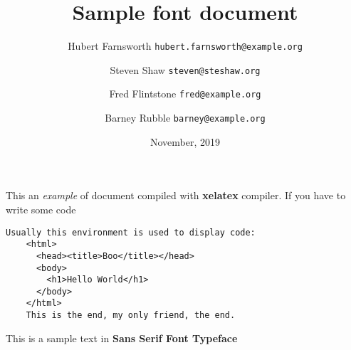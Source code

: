 \documentclass[14pt]{article}
\title{Sample font document}
\author{
  Hubert Farnsworth \texttt{hubert.farnsworth@example.org}
  \and
  Steven Shaw \texttt{steven@steshaw.org}
  \and
  Fred Flintstone \texttt{fred@example.org}
  \and
  Barney Rubble \texttt{barney@example.org}
}
\date{November, 2019}
\begin{document}
  \maketitle

  This an \textit{example} of document compiled with \textbf{xelatex} compiler.
  If you have to write some code

  \begin{Verbatim}[gobble = 4]
    Usually this environment is used to display code:
    <html>
      <head><title>Boo</title></head>
      <body>
        <h1>Hello World</h1>
      </body>
    </html>
    This is the end, my only friend, the end.
  \end{Verbatim}

  {\sffamily This is a sample text in \textbf{Sans Serif Font Typeface}}
\end{document}
